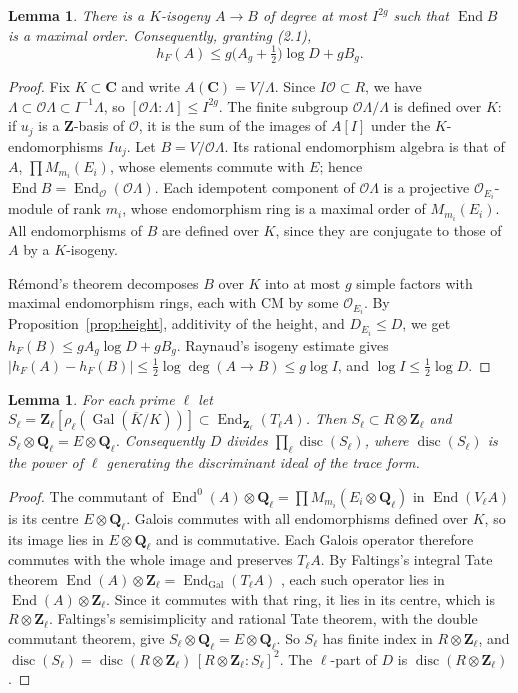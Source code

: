\documentclass[11pt,a4paper]{article}
\theoremstyle{plain}
\newtheorem{lemma}[theorem]{Lemma}
\theoremstyle{remark}
\newcommand{\Q}{\mathbf Q}
\newcommand{\Z}{\mathbf Z}
\newcommand{\C}{\mathbf C}
\newcommand{\OO}{\mathcal O}
\newcommand{\Gal}{\operatorname{Gal}}
\newcommand{\End}{\operatorname{End}}
\newcommand{\disc}{\operatorname{disc}}
\begin{document}
\begin{lemma}\label{lem:saturation}
There is a $K$-isogeny $A\to B$ of degree at most $I^{2g}$ such that $\End B$ is a maximal order. Consequently,
granting (2.1),
\[
 h_F(A)\leq g\bigl(A_g+\tfrac12\bigr)\log D+gB_g.
\]
\end{lemma}

\begin{proof}
Fix $K\subset\C$ and write $A(\C)=V/\Lambda$. Since $I\OO\subset R$, we have $\Lambda\subset\OO\Lambda\subset I^{-1}\Lambda$,
so $[\OO\Lambda:\Lambda]\leq I^{2g}$. The finite subgroup $\OO\Lambda/\Lambda$ is defined over $K$: if $u_j$ is a
$\Z$-basis of $\OO$, it is the sum of the images of $A[I]$ under the $K$-endomorphisms $Iu_j$. Let $B=V/\OO\Lambda$.
Its rational endomorphism algebra is that of $A$, $\prod M_{m_i}(E_i)$, whose elements commute with $E$; hence
$\End B=\End_\OO(\OO\Lambda)$. Each idempotent component of $\OO\Lambda$ is a projective $\OO_{E_i}$-module of rank
$m_i$, whose endomorphism ring is a maximal order of $M_{m_i}(E_i)$. All endomorphisms of $B$ are defined over $K$,
since they are conjugate to those of $A$ by a $K$-isogeny.

R\'emond's theorem \cite[Th\'eor\`eme~1.2]{Remond} decomposes $B$ over $K$ into at most $g$ simple factors with
maximal endomorphism rings, each with CM by some $\OO_{E_i}$. By Proposition~\ref{prop:height}, additivity of the
height, and $D_{E_i}\leq D$, we get $h_F(B)\leq gA_g\log D+gB_g$. Raynaud's isogeny estimate \cite{Raynaud} gives
$|h_F(A)-h_F(B)|\leq\frac12\log\deg(A\to B)\leq g\log I$, and $\log I\leq\frac12\log D$.
\end{proof}

\begin{lemma}\label{lem:centre}
For each prime $\ell$ let $S_\ell=\Z_\ell[\rho_\ell(\Gal(\overline K/K))]\subset\End_{\Z_\ell}(T_\ell A)$. Then
$S_\ell\subset R\otimes\Z_\ell$ and $S_\ell\otimes\Q_\ell=E\otimes\Q_\ell$. Consequently $D$ divides
$\prod_\ell\disc(S_\ell)$, where $\disc(S_\ell)$ is the power of $\ell$ generating the discriminant ideal of the
trace form.
\end{lemma}

\begin{proof}
The commutant of $\End^0(A)\otimes\Q_\ell=\prod M_{m_i}(E_i\otimes\Q_\ell)$ in $\End(V_\ell A)$ is its centre
$E\otimes\Q_\ell$. Galois commutes with all endomorphisms defined over $K$, so its image lies in $E\otimes\Q_\ell$ and
is commutative. Each Galois operator therefore commutes with the whole image and preserves $T_\ell A$. By Faltings's
integral Tate theorem $\End(A)\otimes\Z_\ell=\End_{\Gal}(T_\ell A)$ \cite{Faltings}, each such operator lies in
$\End(A)\otimes\Z_\ell$. Since it commutes with that ring, it lies in its centre, which is $R\otimes\Z_\ell$.
Faltings's semisimplicity and rational Tate theorem, with the double commutant theorem, give
$S_\ell\otimes\Q_\ell=E\otimes\Q_\ell$. So $S_\ell$ has finite index in $R\otimes\Z_\ell$, and
$\disc(S_\ell)=\disc(R\otimes\Z_\ell)\,[R\otimes\Z_\ell:S_\ell]^2$. The $\ell$-part of $D$ is
$\disc(R\otimes\Z_\ell)$.
\end{proof}
\end{document}

